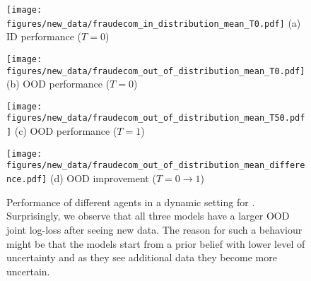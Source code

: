 \begin{figure}[h]
\centering
\begin{minipage}[b]{0.24\textwidth}
\centering
\texttt{[image: figures/new\_data/fraudecom\_in\_distribution\_mean\_T0.pdf]}
{\small{{(a)} ID performance ($T=0$) }} 
\end{minipage}
\hfill
\begin{minipage}[b]{0.24\textwidth}
\centering \texttt{[image: figures/new\_data/fraudecom\_out\_of\_distribution\_mean\_T0.pdf]}
{\small{{(b)} OOD performance ($T=0$) }} 
\end{minipage}
\hfill
\begin{minipage}[b]{0.24\textwidth}
\centering \texttt{[image: figures/new\_data/fraudecom\_out\_of\_distribution\_mean\_T50.pdf]}
{\small{{(c)} OOD performance ($T=1$) }} 
\end{minipage}
\hfill
\begin{minipage}[b]{0.24\textwidth}
\centering \texttt{[image: figures/new\_data/fraudecom\_out\_of\_distribution\_mean\_difference.pdf]}
{\small{{(d)} OOD improvement ($T=0 \to 1$) }} 
\end{minipage}
\caption{Performance of different agents in a dynamic setting for \fraudecom. Surprisingly, we observe that all three models have a larger OOD joint log-loss after seeing new data. The reason for such a behaviour might be that the models start from a prior belief with lower level of uncertainty and as they see additional data they become more uncertain. }
\label{fig:dynamic_setting_fraudecom}
\end{figure}

